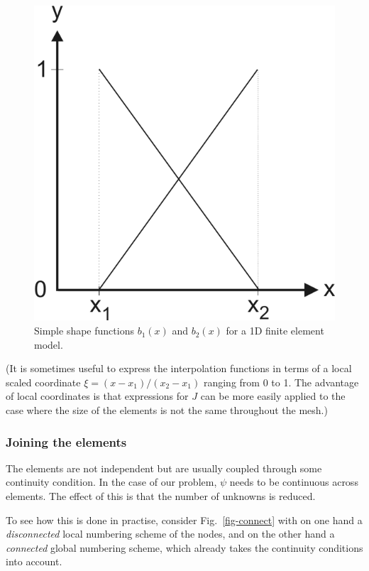 \begin{figure}
\centering
\includegraphics{numeric/figures/interpol}
\caption{Simple shape functions $b_1(x)$ and $b_2(x)$ for a 1D finite element model.}
\label{fig-shape}
\end{figure}

(It is sometimes useful to express the interpolation functions in terms of a local scaled coordinate $\xi=(x-x_1)/(x_2-x_1)$ ranging from 0 to 1. The advantage of local coordinates is that expressions for $J$ can be more easily applied to the case where the size of the elements is not the same throughout the mesh.)

\subsubsection{Joining the elements}

The elements are not independent but are usually coupled through some continuity condition. In the case of our problem, $\psi$ needs to be continuous across elements. The effect of this is that the number of unknowns is reduced.

To see how this is done in practise, consider Fig.~\ref{fig-connect}  with on one hand a \emph{disconnected} local numbering scheme of the nodes, and on the other hand a \emph{connected} global numbering scheme, which already takes the continuity conditions into account.


